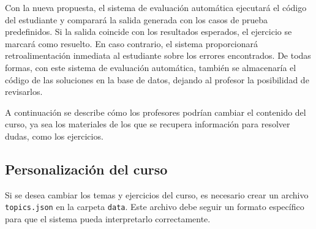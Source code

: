 Con la nueva propuesta, el sistema de evaluación automática ejecutará el código del estudiante y comparará la salida generada con los casos de prueba predefinidos. Si la salida coincide con los resultados esperados, el ejercicio se marcará como resuelto. En caso contrario, el sistema proporcionará retroalimentación inmediata al estudiante sobre los errores encontrados. De todas formas, con este sistema de evaluación automática, también se almacenaría el código de las soluciones en la base de datos, dejando al profesor la posibilidad de revisarlos.

A continuación se describe cómo los profesores podrían cambiar el contenido del curso, ya sea los materiales de los que se recupera información para resolver dudas, como los ejercicios.

\subsection{Personalización del curso}

Si se desea cambiar los temas y ejercicios del curso, es necesario crear un archivo \texttt{topics.json} en la carpeta \texttt{data}. Este archivo debe seguir un formato específico para que el sistema pueda interpretarlo correctamente.


